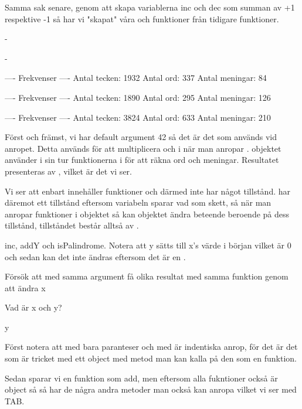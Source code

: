 Samma sak senare, genom att skapa variablerna inc och dec som summan av +1 respektive -1 så har vi "skapat" våra  och  funktioner från tidigare funktioner.

\Task

\Subtask -

\Subtask -

\Subtask
\begin{REPLnonum}

---- Frekvenser ----
Antal tecken: 1932
Antal ord: 337
Antal meningar: 84

---- Frekvenser ----
Antal tecken: 1890
Antal ord: 295
Antal meningar: 126

---- Frekvenser ----
Antal tecken: 3824
Antal ord: 633
Antal meningar: 210

\end{REPLnonum}

Först och främst, vi har default argument 42 så det är det som används vid anropet. Detta används för att multiplicera  och  i  när man anropar .  objektet använder i sin tur funktionerna i  för att räkna ord och meningar. Resultatet presenteras av , vilket är det vi ser.

\Subtask Vi ser att  enbart innehåller funktioner och därmed inte har något tillstånd.  har däremot ett tillstånd eftersom variabeln  sparar vad som skett, så när man anropar funktioner i objektet så kan objektet ändra beteende beroende på dess tillstånd, tillståndet består alltså av .

\Task

\Subtask inc, addY och isPalindrome. Notera att y sätts till x's värde i början vilket är 0 och sedan kan det inte ändras eftersom det är en .

\Subtask Försök att med samma argument få olika resultat med samma funktion genom att ändra x

\Subtask Vad är x och y?

\Subtask y

\Task

\Subtask
Först notera att  med bara paranteser och med  är indentiska anrop, för det är det som är tricket med ett object med  metod man kan kalla på den som en funktion.

Sedan sparar vi en funktion som add, men eftersom alla fukntioner också är object så så har de några andra metoder man också kan anropa vilket vi ser med TAB.

